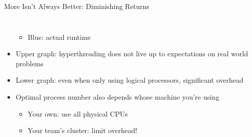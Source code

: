 \begin{frame}{More Isn't Always Better: Diminishing Returns}
\begin{columns}
\begin{itemize}
\begin{itemize}
	\item Blue: actual runtime
	\end{itemize}
\item Upper graph: hyperthreading does not live up to expectations on real world problems
\item Lower graph: even when only using logical processors, significant overhead
\item[\Thus] Optimal process number also depends whose machine you're using
	\begin{itemize}
	\item Your own: use all physical CPUs
	\item Your team's cluster: limit overhead!
	\end{itemize}
\end{itemize}
\end{columns}
%
\end{frame}
